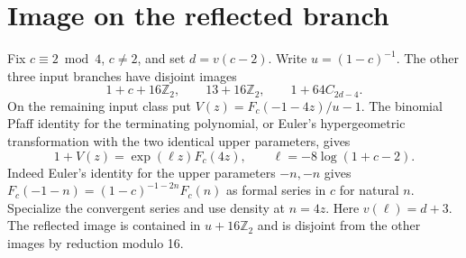 \documentclass[11pt]{article}
\newcommand{\Z}{\mathbb Z_2}
\begin{document}
\section{Image on the reflected branch}
Fix $c\equiv2\bmod4$, $c\ne2$, and set $d=v(c-2)$. Write $u=(1-c)^{-1}$.
The other three input branches have disjoint images
\[
 1+c+16\Z,\qquad 13+16\Z,\qquad 1+64C_{2d-4}.
\]
On the remaining input class put $V(z)=F_c(-1-4z)/u-1$. The binomial Pfaff identity for the terminating polynomial, or Euler's hypergeometric transformation with the two identical upper parameters, gives
\[
 1+V(z)=\exp(\ell z) F_c(4z),\qquad \ell=-8\log(1+c-2).
\]
Indeed Euler's identity for the upper parameters $-n,-n$ gives $F_c(-1-n)=(1-c)^{-1-2n}F_c(n)$ as formal series in $c$ for natural $n$. Specialize the convergent series and use density at $n=4z$. Here $v(\ell)=d+3$. The reflected image is contained in $u+16\Z$ and is disjoint from the other images by reduction modulo 16.
\end{document}
